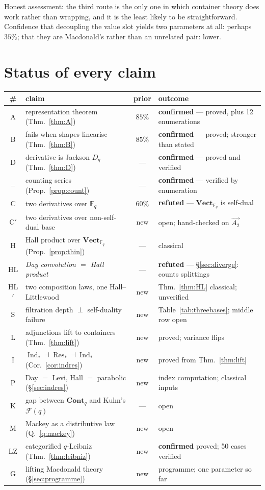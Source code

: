 \documentclass[11pt,a4paper]{article}
\theoremstyle{definition}
\theoremstyle{remark}
\newcommand{\FF}{\mathbb{F}}
\newcommand{\cat}[1]{\mathbf{#1}}
\newcommand{\Vect}{\cat{Vect}}
\newcommand{\Cont}{\cat{Cont}}
\DeclareMathOperator{\Ind}{Ind}
\DeclareMathOperator{\Res}{Res}
\newcommand{\OK}{\textcolor{okgreen}{\textbf{confirmed}}}
\newcommand{\NO}{\textcolor{nored}{\textbf{refuted}}}
\begin{document}
\noindent
Honest assessment: the third route is the only one in which container theory does
work rather than wrapping, and it is the least likely to be straightforward.
Confidence that decoupling the value slot yields two parameters at all: perhaps
$35\%$; that they are Macdonald's rather than an unrelated pair: lower.

\section{Status of every claim}\label{sec:status}

\begin{center}
\small
\setlength{\tabcolsep}{2.5pt}
\begin{tabular}{clcl}
\toprule
\# & claim & prior & outcome \\
\midrule
A & representation theorem (Thm.~\ref{thm:A}) & $85\%$ & \OK{} --- proved, plus 12 enumerations \\
B & fails when shapes linearise (Thm.~\ref{thm:B}) & $85\%$ & \OK{} --- proved; stronger than stated \\
D & derivative is Jackson $D_q$ (Thm.~\ref{thm:D}) & --- & \OK{} --- proved and verified \\
-- & counting series (Prop.~\ref{prop:count}) & --- & \OK{} --- verified by enumeration \\
C & two derivatives over $\FF_q$ & $60\%$ & \NO{} --- $\Vect_{\FF_q}$ is self-dual \\
C$'$ & two derivatives over non-self-dual base & new & open; hand-checked on $\vec{A_2}$ \\
H & Hall product over $\Vect_{\FF_q}$ (Prop.~\ref{prop:thin}) & --- & classical \\
HL & \emph{Day convolution $=$ Hall product} & --- & \NO{} --- \S\ref{sec:diverge}: counts splittings \\
HL$'$ & two composition laws, one Hall--Littlewood & new & Thm.~\ref{thm:HL} classical; unverified \\[-1pt]
S & filtration depth $\perp$ self-duality failure & new & Table~\ref{tab:threebases}; middle row open \\
L & adjunctions lift to containers (Thm.~\ref{thm:lift}) & new & proved; variance flips \\
I & $\Ind_* \dashv \Res_* \dashv \Ind_*$ (Cor.~\ref{cor:indres}) & new & proved from Thm.~\ref{thm:lift} \\
P & Day $=$ Levi, Hall $=$ parabolic (\S\ref{sec:indres}) & new & index computation; classical inputs \\
K & gap between $\Cont_q$ and Kuhn's $\mathcal{F}(q)$ & --- & open \\
M & Mackey as a distributive law (Q.~\ref{q:mackey}) & new & open \\
LZ & categorified $q$-Leibniz (Thm.~\ref{thm:leibniz}) & new & \OK{} proved; 50 cases verified \\
G & lifting Macdonald theory (\S\ref{sec:programme}) & new & programme; one parameter so far \\
\bottomrule
\end{tabular}
\end{center}
\end{document}
